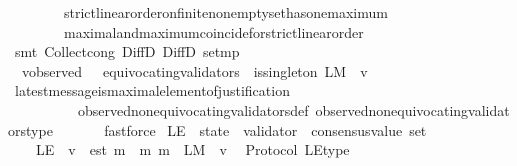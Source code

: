 \begin{isabellebody}
\ \ \ \ \ \ \ \ strict{\isacharunderscore}linear{\isacharunderscore}order{\isacharunderscore}on{\isacharunderscore}finite{\isacharunderscore}non{\isacharunderscore}empty{\isacharunderscore}set{\isacharunderscore}has{\isacharunderscore}one{\isacharunderscore}maximum\isanewline
\ \ \ \ \ \ \ \ maximal{\isacharunderscore}and{\isacharunderscore}maximum{\isacharunderscore}coincide{\isacharunderscore}for{\isacharunderscore}strict{\isacharunderscore}linear{\isacharunderscore}order\isanewline
\ \ \ \ \isamarkupfalse%
\ {\isacharparenleft}smt\ Collect{\isacharunderscore}cong\ DiffD{}\ DiffD{}\ set{\isacharunderscore}mp{\isacharparenright}\isanewline
\ \ \isamarkupfalse%
\ \isamarkupfalse%
\ {\isachardoublequoteopen}{\isasymforall}{\isasymsigma}{\isasymin}{\isasymSigma}{\isachardot}\ {\isasymforall}v{\isasymin}observed\ {\isasymsigma}\ {\isacharminus}\ equivocating{\isacharunderscore}validators\ {\isasymsigma}{\isachardot}\ is{\isacharunderscore}singleton\ {\isacharparenleft}L{\isacharunderscore}M\ {\isasymsigma}\ v{\isacharparenright}{\isachardoublequoteclose}\ \ \isanewline
\ \ \ \ \isamarkupfalse%
\ latest{\isacharunderscore}message{\isacharunderscore}is{\isacharunderscore}maximal{\isacharunderscore}element{\isacharunderscore}of{\isacharunderscore}justification\isanewline
\ \ \ \ \ \ \ \ \ \ observed{\isacharunderscore}non{\isacharunderscore}equivocating{\isacharunderscore}validators{\isacharunderscore}def\ observed{\isacharunderscore}non{\isacharunderscore}equivocating{\isacharunderscore}validators{\isacharunderscore}type\ \isanewline
\ \ \ \ \isamarkupfalse%
\ fastforce\isanewline
{}\isamarkupfalse%
%
\endisatagproof
{\isafoldproof}%
%
\isadelimproof
\isanewline
%
\endisadelimproof
\isanewline
\isanewline
\isanewline
\isanewline
\isanewline
\isanewline
\isanewline
{}\isamarkupfalse%
\ L{\isacharunderscore}E\ {\isacharcolon}{\isacharcolon}\ {\isachardoublequoteopen}state\ {\isasymRightarrow}\ validator\ {\isasymRightarrow}\ consensus{\isacharunderscore}value\ set{\isachardoublequoteclose}\isanewline
\ \ \isanewline
\ \ \ \ {\isachardoublequoteopen}L{\isacharunderscore}E\ {\isasymsigma}\ v\ {\isacharequal}\ {\isacharbraceleft}est\ m\ {\isacharbar}\ m{\isachardot}\ m\ {\isasymin}\ L{\isacharunderscore}M\ {\isasymsigma}\ v{\isacharbraceright}{\isachardoublequoteclose}\isanewline
\isanewline
{}\isamarkupfalse%
\ {\isacharparenleft}\ Protocol{\isacharparenright}\ L{\isacharunderscore}E{\isacharunderscore}type\ {\isacharcolon}\isanewline

\end{isabellebody}
